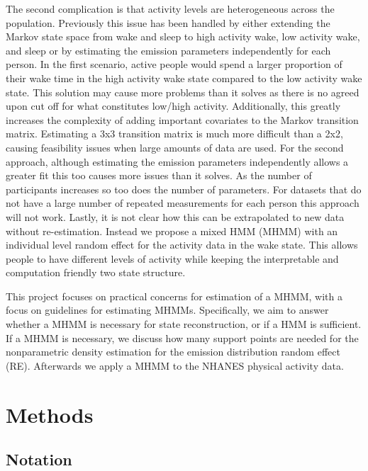 \documentclass{article}
\begin{document}
The second complication is that activity levels are heterogeneous across 
the population. Previously this issue has been handled by either extending 
the Markov state space from wake and sleep to high activity wake, low activity
 wake, and sleep or by estimating the emission parameters independently for 
 each person. In the first scenario, active people would spend a larger 
 proportion of their wake time in the high activity wake state compared to 
 the low activity wake state.  This solution may cause more problems than it 
 solves as there is no agreed upon cut off for what constitutes low/high activity. 
 Additionally, this greatly increases the complexity of adding important covariates 
 to the Markov transition matrix. Estimating a 3x3 transition matrix is much 
 more difficult than a 2x2, causing feasibility issues when large amounts of 
 data are used. For the second approach, although estimating the emission parameters 
 independently allows a greater fit this too causes more issues than it solves. 
 As the number of participants increases so too does the number of parameters. 
 For datasets that do not have a large number of repeated measurements for each 
 person this approach will not work. Lastly, it is not clear how this can be 
 extrapolated to new data without re-estimation. Instead we propose a mixed 
 HMM (MHMM) \cite{Altman2007} with an individual level random effect for the 
 activity data in the wake state. This allows people to have different levels 
 of activity while keeping the interpretable and computation friendly two state structure.

This project focuses on practical concerns for estimation of a MHMM, with a 
focus on guidelines for estimating MHMMs. Specifically, we aim to answer whether 
a MHMM is necessary for state reconstruction, or if a HMM is sufficient. If a 
MHMM is necessary, we discuss how many support points are needed for the nonparametric 
density estimation for the emission distribution random effect (RE). Afterwards 
we apply a MHMM to the NHANES physical activity data.

\section{Methods}
\subsection{Notation}
\end{document}
